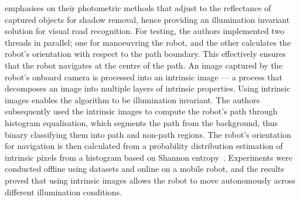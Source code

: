 emphasises on their photometric methods that adjust to the reflectance of captured objects for shadow removal, hence providing an illumination invariant solution for visual road recognition. For testing, the authors implemented two threads in parallel; one for manoeuvring the robot, and the other calculates the robot's orientation with respect to the path boundary. This effectively ensures that the robot navigates at the centre of the path. An image captured by the robot's onboard camera is processed into an intrinsic image --- a process that decomposes an image into multiple layers of intrinsic properties. Using intrinsic images enables the algorithm to be illumination invariant. The authors subsequently used the intrinsic images to compute the robot's path through histogram equalisation, which segments the path from the background, thus binary classifying them into path and non-path regions. The robot's orientation for navigation is then calculated from a probability distribution estimation of intrinsic pixels from a histogram based on Shannon entropy~\cite{c._e._shannon_mathematical_1948}. Experiments were conducted offline using datasets and online on a mobile robot, and the results proved that using intrinsic images allows the robot to move autonomously across different illumination conditions.


